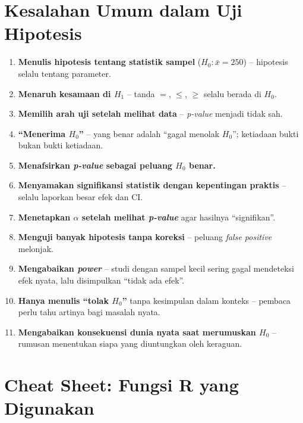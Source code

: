 \documentclass[
  indonesian,
  letterpaper,
]{book}
\providecommand{\tightlist}{%
  \setlength{\itemsep}{0pt}\setlength{\parskip}{0pt}}
\begin{document}
\section{Kesalahan Umum dalam Uji
Hipotesis}\label{kesalahan-umum-dalam-uji-hipotesis}

\begin{enumerate}
\def\labelenumi{\arabic{enumi}.}
\tightlist
\item
  \textbf{Menulis hipotesis tentang statistik sampel}
  (\(H_0 : \bar{x} = 250\)) -- hipotesis selalu tentang parameter.
\item
  \textbf{Menaruh kesamaan di \(H_1\)} -- tanda \(=\), \(\leq\),
  \(\geq\) selalu berada di \(H_0\).
\item
  \textbf{Memilih arah uji setelah melihat data} -- \emph{p-value}
  menjadi tidak sah.
\item
  \textbf{``Menerima \(H_0\)''} -- yang benar adalah ``gagal menolak
  \(H_0\)''; ketiadaan bukti bukan bukti ketiadaan.
\item
  \textbf{Menafsirkan \emph{p-value} sebagai peluang \(H_0\) benar.}
\item
  \textbf{Menyamakan signifikansi statistik dengan kepentingan praktis}
  -- selalu laporkan besar efek dan CI.
\item
  \textbf{Menetapkan \(\alpha\) setelah melihat \emph{p-value}} agar
  hasilnya ``signifikan''.
\item
  \textbf{Menguji banyak hipotesis tanpa koreksi} -- peluang \emph{false
  positive} melonjak.
\item
  \textbf{Mengabaikan \emph{power}} -- studi dengan sampel kecil sering
  gagal mendeteksi efek nyata, lalu disimpulkan ``tidak ada efek''.
\item
  \textbf{Hanya menulis ``tolak \(H_0\)''} tanpa kesimpulan dalam
  konteks -- pembaca perlu tahu artinya bagi masalah nyata.
\item
  \textbf{Mengabaikan konsekuensi dunia nyata saat merumuskan \(H_0\)}
  -- rumusan menentukan siapa yang diuntungkan oleh keraguan.
\end{enumerate}

\section{Cheat Sheet: Fungsi R yang
Digunakan}\label{cheat-sheet-fungsi-r-yang-digunakan-1}
\end{document}
